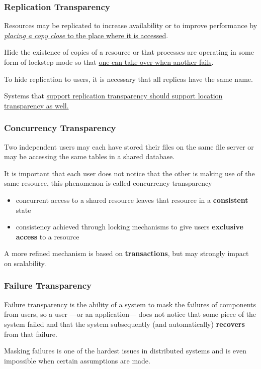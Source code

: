 \subsubsection{Replication Transparency}
Resources may be replicated to increase availability or to improve performance by \ul{\textit{placing a copy close} to the place where it is accessed}.

Hide the existence of copies of a resource or that processes are operating in some form of lockstep mode so that \ul{one can take over when another fails}.

To hide replication to users, it is necessary that all replicas have the same name.

Systems that \ul{support replication transparency should support location transparency as well.}

\subsubsection{Concurrency Transparency}
Two independent users may each have stored their files on the same file server or may be accessing the same tables in a shared database.

It is important that each user does not notice that the other is making use of the same
resource, this phenomenon is called concurrency transparency

\begin{itemize}
   \item concurrent access to a shared resource leaves that resource in a \textbf{consistent} state
   
   \item consistency achieved through locking mechanisms to give users \textbf{exclusive access} to a
   resource
\end{itemize}
   
A more refined mechanism is based on \textbf{transactions}, but may strongly impact on scalability.

\subsubsection{Failure Transparency}
Failure transparency is the ability of a system to mask the failures of components from users, so a user ---or an application--- does not notice that some piece of the system failed and that the system subsequently (and automatically) \textbf{recovers} from that failure.

Masking failures is one of the hardest issues in distributed systems and is even impossible when certain assumptions are made.

